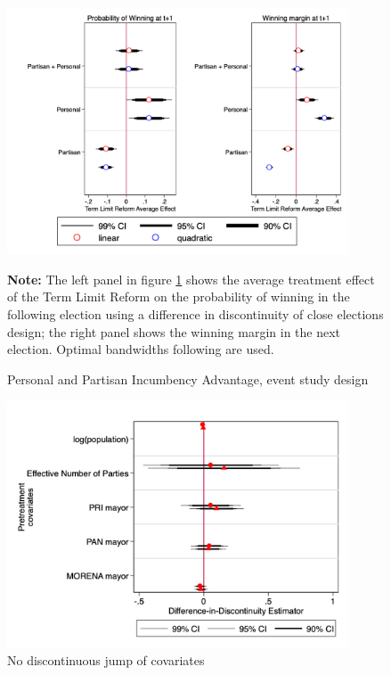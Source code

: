 \documentclass[12pt]{amsart}
\numberwithin{equation}{section}
\theoremstyle{definition}
\theoremstyle{definition}
\theoremstyle{definition}
\begin{document}
\begin{appendix}
 \begin{figure}[h]   
\centering
 \caption{Personal and Partisan Incumbency Advantage, event study design}
 \label{fig:naive_partisan&personal}
 \includegraphics[width=0.9\textwidth]{Figures_incumbency/naive_personalvspartisan_advantage.png}
 
  \textbf{Note:} The left panel in figure \ref{fig:naive_partisan&personal} shows the average treatment effect of the Term Limit Reform on the probability of winning in the following election using a difference in discontinuity of close elections design; the right panel shows the winning margin in the next election. Optimal bandwidths following \citet{calonicoetal_2014} are used. 
\end{figure} 
       



 \begin{figure}[h]   
\centering
 \caption{No discontinuous jump of covariates}
 \label{fig:jump_covariates}
\includegraphics[width=0.9\textwidth]{Figures_incumbency/nojump.png}
       \captionsetup{justification=centering}
    

\end{figure}
\end{appendix}
\end{document}
